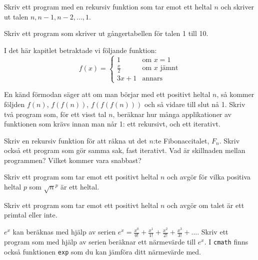 \begin{exercise}
Skriv ett program med en rekursiv funktion som tar emot ett heltal $n$ och skriver ut talen $n, n-1, n-2, ..., 1$.
\end{exercise}
\begin{exercise}
Skriv ett program som skriver ut gångertabellen för talen 1 till 10.
\end{exercise}
\begin{exercise}
I det här kapitlet betraktade vi följande funktion:
$$
f(x) =
\left\{
    \begin{array}{lll}
        1 & \mbox{om } x = 1\\
        \frac{x}{2} & \mbox{om } x \mbox{ jämnt}\\
        3x+1 & \mbox{annars}
    \end{array}
\right.
$$

En känd förmodan säger att om man börjar med ett positivt heltal $n$, så kommer följden $f(n)$, $f(f(n))$, $f(f(f(n)))$ och så vidare till slut nå 1. Skriv två program som, för ett visst tal $n$, beräknar hur många applikationer av funktionen som krävs innan man når 1: ett rekursivt, och ett iterativt.
\end{exercise}
\begin{exercise}
Skriv en rekursiv funktion för att räkna ut det $n$:te Fibonaccitalet, $F_n$. Skriv också ett program som gör samma sak, fast iterativt. Vad är skillnaden mellan programmen? Vilket kommer vara snabbast?
\end{exercise}
\begin{exercise}
Skriv ett program som tar emot ett positivt heltal $n$ och avgör för vilka positiva heltal $p$ som $\sqrt{n}^p$ är ett heltal.
\end{exercise}
\begin{exercise}
Skriv ett program som tar emot ett positivt heltal $n$ och avgör om talet är ett primtal eller inte.
\end{exercise}
\begin{exercise}
$e^x$ kan beräknas med hjälp av serien $e^x = \frac{x^0}{0!} + \frac{x^1}{1!} + \frac{x^2}{2!} + \frac{x^3}{3!} + ...$. Skriv ett program som med hjälp av serien beräknar ett närmevärde till $e^x$. I \texttt{cmath} finns också funktionen \texttt{exp} som du kan jämföra ditt närmevärde med.
\end{exercise}